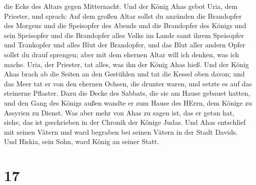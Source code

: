 die Ecke des Altars gegen Mitternacht.  Und der König Ahas
gebot Uria, dem Priester, und sprach: Auf dem großen Altar sollst du
anzünden die Brandopfer des Morgens und die Speisopfer des Abends und
die Brandopfer des Königs und sein Speisopfer und die Brandopfer alles
Volks im Lande samt ihrem Speisopfer und Trankopfer und alles Blut der
Brandopfer, und das Blut aller andern Opfer sollst du drauf sprengen;
aber mit dem ehernen Altar will ich denken, was ich mache. 
Uria, der Priester, tat alles, was ihn der König Ahas hieß.
 Und der König Ahas brach ab die Seiten an den Gestühlen
und tat die Kessel oben davon; und das Meer tat er von den ehernen
Ochsen, die drunter waren, und setzte es auf das steinerne Pflaster.
 Dazu die Decke des Sabbats, die sie am Hause gebauet
hatten, und den Gang des Königs außen wandte er zum Hause des HErrn, dem
Könige zu Assyrien zu Dienst.  Was aber mehr von Ahas zu
sagen ist, das er getan hat, siehe, das ist geschrieben in der Chronik
der Könige Judas.  Und Ahas entschlief mit seinen Vätern
und ward begraben bei seinen Vätern in der Stadt Davids. Und Hiskia,
sein Sohn, ward König an seiner Statt.

\hypertarget{section-16}{%
\section{17}\label{section-16}}


